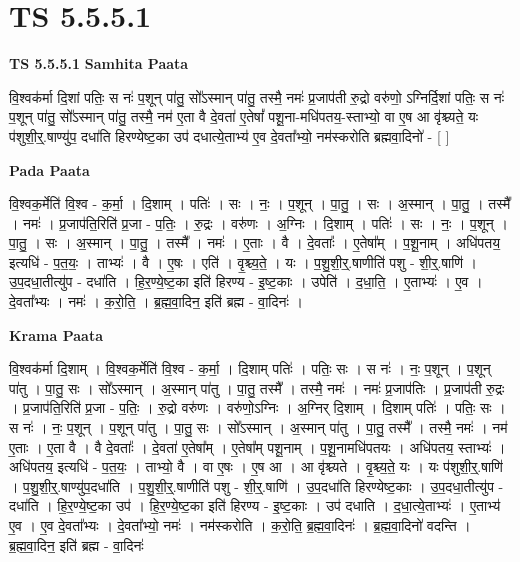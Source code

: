\documentclass[17pt]{extarticle}
\begin{document}
\section{ TS 5.5.5.1 }

\textbf{TS 5.5.5.1 } \newline
\textbf{Samhita Paata} \newline

वि॒श्वक॑र्मा दि॒शां पतिः॒ स नः॑ प॒शून् पा॑तु॒ सो᳚ऽस्मान् पा॑तु॒ तस्मै॒ नमः॑ प्र॒जाप॑ती रु॒द्रो वरु॑णो॒ ऽग्निर्दि॒शां पतिः॒ स नः॑ प॒शून् पा॑तु॒ सो᳚ऽस्मान् पा॑तु॒ तस्मै॒ नम॑ ए॒ता वै दे॒वता॑ ए॒तेषां᳚ पशू॒ना-मधि॑पतय॒-स्ताभ्यो॒ वा ए॒ष आ वृ॑श्च्यते॒ यः प॑शुशी॒र्॒.षाण्यु॑प॒ दधा॑ति हिरण्येष्ट॒का उप॑ दधात्ये॒ताभ्य॑ ए॒व दे॒वता᳚भ्यो॒ नम॑स्करोति ब्रह्मवा॒दिनो॑ - [  ] \newline

\textbf{Pada Paata} \newline

वि॒श्वक॒र्मेति॑ वि॒श्व - क॒र्मा॒ । दि॒शाम् । पतिः॑ । सः । नः॒ । प॒शून् । पा॒तु॒ । सः । अ॒स्मान् । पा॒तु॒ । तस्मै᳚ । नमः॑ । प्र॒जाप॑ति॒रिति॑ प्र॒जा - प॒तिः॒ । रु॒द्रः । वरु॑णः । अ॒ग्निः । दि॒शाम् । पतिः॑ । सः । नः॒ । प॒शून् । पा॒तु॒ । सः । अ॒स्मान् । पा॒तु॒ । तस्मै᳚ । नमः॑ । ए॒ताः । वै । दे॒वताः᳚ । ए॒तेषा᳚म् । प॒शू॒नाम् । अधि॑पतय॒ इत्यधि॑ - प॒त॒यः॒ । ताभ्यः॑ । वै । ए॒षः । एति॑ । वृ॒श्च्य॒ते॒ । यः । प॒शु॒शी॒र्॒.षाणीति॑ पशु - शी॒र्॒.षाणि॑ । उ॒प॒दधा॒तीत्यु॑प - दधा॑ति । हि॒र॒ण्ये॒ष्ट॒का इति॑ हिरण्य - इ॒ष्ट॒काः । उपेति॑ । द॒धा॒ति॒ । ए॒ताभ्यः॑ । ए॒व । दे॒वता᳚भ्यः । नमः॑ । क॒रो॒ति॒ । ब्र॒ह्म॒वा॒दिन॒ इति॑ ब्रह्म - वा॒दिनः॑ ।  \newline


\textbf{Krama Paata} \newline

वि॒श्वक॑र्मा दि॒शाम् । वि॒श्वक॒र्मेति॑ वि॒श्व - क॒र्मा॒ । दि॒शाम् पतिः॑ । पतिः॒ सः । स नः॑ । नः॒ प॒शून् । प॒शून् पा॑तु । पा॒तु॒ सः । सो᳚ऽस्मान् । अ॒स्मान् पा॑तु । पा॒तु॒ तस्मै᳚ । तस्मै॒ नमः॑ । नमः॑ प्र॒जाप॑तिः । प्र॒जाप॑ती रु॒द्रः । प्र॒जाप॑ति॒रिति॑ प्र॒जा - प॒तिः॒ । रु॒द्रो वरु॑णः । वरु॑णो॒ऽग्निः । अ॒ग्निर् दि॒शाम् । दि॒शाम् पतिः॑ । पतिः॒ सः । स नः॑ । नः॒ प॒शून् । प॒शून् पा॑तु । पा॒तु॒ सः । सो᳚ऽस्मान् । अ॒स्मान् पा॑तु । पा॒तु॒ तस्मै᳚ । तस्मै॒ नमः॑ । नम॑ ए॒ताः । ए॒ता वै । वै दे॒वताः᳚ । दे॒वता॑ ए॒तेषा᳚म् । ए॒तेषा᳚म् पशू॒नाम् । प॒शू॒नामधि॑पतयः । अधि॑पतय॒ स्ताभ्यः॑ । अधि॑पतय॒ इत्यधि॑ - प॒त॒यः॒ । ताभ्यो॒ वै । वा ए॒षः । ए॒ष आ । आ वृ॑श्च्यते । वृ॒श्च्य॒ते॒ यः । यः प॑शुशी॒र्॒.षाणि॑ । प॒शु॒शी॒र्॒.षाण्यु॑प॒दधा॑ति । प॒शु॒शी॒र्॒.षाणीति॑ पशु - शी॒र्॒.षाणि॑ । उ॒प॒दधा॑ति हिरण्येष्ट॒काः । उ॒प॒दधा॒तीत्यु॑प - दधा॑ति । हि॒र॒ण्ये॒ष्ट॒का उप॑ । हि॒र॒ण्ये॒ष्ट॒का इति॑ हिरण्य - इ॒ष्ट॒काः । उप॑ दधाति । द॒धा॒त्ये॒ताभ्यः॑ । ए॒ताभ्य॑ ए॒व । ए॒व दे॒वता᳚भ्यः । दे॒वता᳚भ्यो॒ नमः॑ । नम॑स्करोति । क॒रो॒ति॒ ब्र॒ह्म॒वा॒दिनः॑ । ब्र॒ह्म॒वा॒दिनो॑ वदन्ति । ब्र॒ह्म॒वा॒दिन॒ इति॑ ब्रह्म - वा॒दिनः॑ \newline
\end{document}
